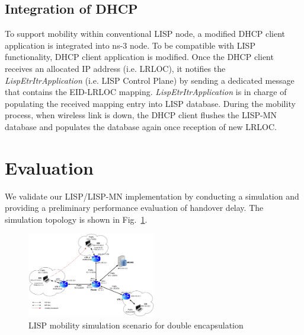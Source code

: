 \subsection{Integration of DHCP}
\label{subsec:DHCP}
To support mobility within conventional LISP node, a modified DHCP client application is integrated into ns-3 node. To be compatible with LISP functionality, DHCP client application is modified. Once the DHCP client receives an allocated IP address (i.e. LRLOC), it notifies the \emph{LispEtrItrApplication} (i.e. LISP Control Plane) by sending a dedicated message that contains the EID-LRLOC mapping. \emph{LispEtrItrApplication} is in charge of populating the received mapping entry into LISP database. During the mobility process, when wireless link is down, the DHCP client flushes the LISP-MN database and populates the database again once reception of new LRLOC. 



\section{Evaluation}
\label{sec:ns3_evaluation}
We validate our LISP/LISP-MN implementation by conducting a simulation and providing a preliminary performance evaluation of handover delay. The simulation topology is shown in Fig.~\ref{sim_scenario}.
\begin{figure}[!th]
	\centering
	\includegraphics[width=0.5\textwidth]{Pics/mobility_through_subnets_2_encap_topo}
	\caption{LISP mobility simulation scenario for double encapsulation}
	\label{sim_scenario}
\end{figure}

